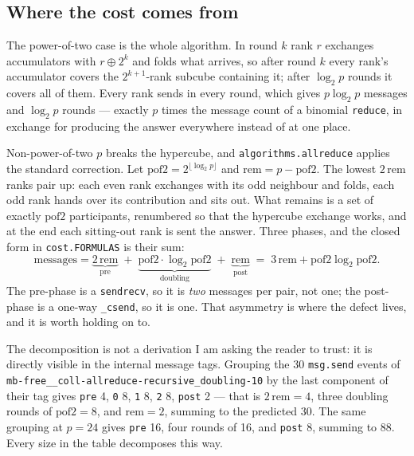 \documentclass[11pt]{article}
\begin{document}
\subsection{Where the cost comes from}

The power-of-two case is the whole algorithm. In round $k$ rank $r$ exchanges accumulators with
$r \oplus 2^k$ and folds what arrives, so after round $k$ every rank's accumulator covers the
$2^{k+1}$-rank subcube containing it; after $\log_2 p$ rounds it covers all of them. Every rank
sends in every round, which gives $p\log_2 p$ messages and $\log_2 p$ rounds --- exactly $p$
times the message count of a binomial \texttt{reduce}, in exchange for producing the answer
everywhere instead of at one place.

Non-power-of-two $p$ breaks the hypercube, and
\texttt{algorithms.allreduce} applies the standard correction. Let
$\mathrm{pof2} = 2^{\lfloor\log_2 p\rfloor}$ and $\mathrm{rem} = p - \mathrm{pof2}$. The lowest
$2\,\mathrm{rem}$ ranks pair up: each even rank exchanges with its odd neighbour and folds, each
odd rank hands over its contribution and sits out. What remains is a set of exactly
$\mathrm{pof2}$ participants, renumbered so that the hypercube exchange works, and at the end
each sitting-out rank is sent the answer. Three phases, and the closed form in
\texttt{cost.FORMULAS} is their sum:
\[
  \text{messages} = \underbrace{2\,\mathrm{rem}}_{\text{pre}}
  \;+\; \underbrace{\mathrm{pof2} \cdot \log_2 \mathrm{pof2}}_{\text{doubling}}
  \;+\; \underbrace{\mathrm{rem}}_{\text{post}}
  \;=\; 3\,\mathrm{rem} + \mathrm{pof2}\log_2\mathrm{pof2}.
\]
The pre-phase is a \texttt{sendrecv}, so it is \emph{two} messages per pair, not one; the
post-phase is a one-way \texttt{\_csend}, so it is one. That asymmetry is where the defect lives,
and it is worth holding on to.

\begin{sloppypar}
The decomposition is not a derivation I am asking the reader to trust: it is directly visible in
the internal message tags. Grouping the 30 \texttt{msg.send} events of
\texttt{mb-free\_\_coll-\allowbreak allreduce-recursive\_doubling-10} by the last component of
their tag gives \texttt{pre} 4, \texttt{0} 8, \texttt{1} 8, \texttt{2} 8, \texttt{post} 2 --- that is
$2\,\mathrm{rem}=4$, three doubling rounds of $\mathrm{pof2}=8$, and $\mathrm{rem}=2$, summing to
the predicted 30. The same grouping at $p=24$ gives \texttt{pre} 16, four rounds of 16, and
\texttt{post} 8, summing to 88. Every size in the table decomposes this way.
\end{sloppypar}
\end{document}
